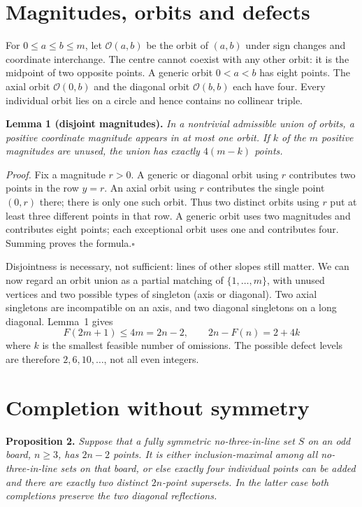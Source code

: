 \documentclass[11pt]{article}
\newcommand{\Ocal}{\mathcal O}
\begin{document}
\section{Magnitudes, orbits and defects}
For $0\le a\le b\le m$, let $\Ocal(a,b)$ be the orbit of $(a,b)$ under sign changes and coordinate interchange. The centre cannot coexist with any other orbit: it is the midpoint of two opposite points. A generic orbit $0<a<b$ has eight points. The axial orbit $\Ocal(0,b)$ and the diagonal orbit $\Ocal(b,b)$ each have four. Every individual orbit lies on a circle and hence contains no collinear triple.

\textbf{Lemma 1 (disjoint magnitudes).} \emph{In a nontrivial admissible union of orbits, a positive coordinate magnitude appears in at most one orbit. If $k$ of the $m$ positive magnitudes are unused, the union has exactly $4(m-k)$ points.}

\emph{Proof.} Fix a magnitude $r>0$. A generic or diagonal orbit using $r$ contributes two points in the row $y=r$. An axial orbit using $r$ contributes the single point $(0,r)$ there; there is only one such orbit. Thus two distinct orbits using $r$ put at least three different points in that row. A generic orbit uses two magnitudes and contributes eight points; each exceptional orbit uses one and contributes four. Summing proves the formula.\hfill$\square$

Disjointness is necessary, not sufficient: lines of other slopes still matter. We can now regard an orbit union as a partial matching of $\{1,\dots,m\}$, with unused vertices and two possible types of singleton (axis or diagonal). Two axial singletons are incompatible on an axis, and two diagonal singletons on a long diagonal. Lemma~1 gives
\[
F(2m+1)\le 4m=2n-2,\qquad 2n-F(n)=2+4k
\]
where $k$ is the smallest feasible number of omissions. The possible defect levels are therefore $2,6,10,\ldots$, not all even integers.

\section{Completion without symmetry}
\textbf{Proposition 2.} \emph{Suppose that a fully symmetric no-three-in-line set $S$ on an odd board, $n\ge3$, has $2n-2$ points. It is either inclusion-maximal among all no-three-in-line sets on that board, or else exactly four individual points can be added and there are exactly two distinct $2n$-point supersets. In the latter case both completions preserve the two diagonal reflections.}
\end{document}
